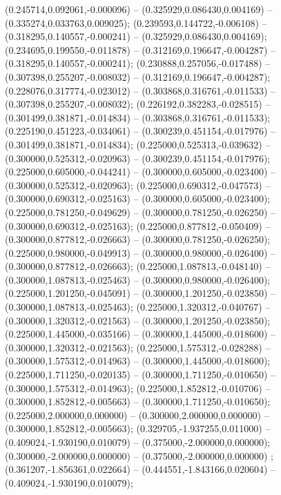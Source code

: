  (0.245714,0.092061,-0.000096) -- (0.325929,0.086430,0.004169) -- (0.335274,0.033763,0.009025);
 (0.239593,0.144722,-0.006108) -- (0.318295,0.140557,-0.000241) -- (0.325929,0.086430,0.004169);
 (0.234695,0.199550,-0.011878) -- (0.312169,0.196647,-0.004287) -- (0.318295,0.140557,-0.000241);
 (0.230888,0.257056,-0.017488) -- (0.307398,0.255207,-0.008032) -- (0.312169,0.196647,-0.004287);
 (0.228076,0.317774,-0.023012) -- (0.303868,0.316761,-0.011533) -- (0.307398,0.255207,-0.008032);
 (0.226192,0.382283,-0.028515) -- (0.301499,0.381871,-0.014834) -- (0.303868,0.316761,-0.011533);
 (0.225190,0.451223,-0.034061) -- (0.300239,0.451154,-0.017976) -- (0.301499,0.381871,-0.014834);
 (0.225000,0.525313,-0.039632) -- (0.300000,0.525312,-0.020963) -- (0.300239,0.451154,-0.017976);
 (0.225000,0.605000,-0.044241) -- (0.300000,0.605000,-0.023400) -- (0.300000,0.525312,-0.020963);
 (0.225000,0.690312,-0.047573) -- (0.300000,0.690312,-0.025163) -- (0.300000,0.605000,-0.023400);
 (0.225000,0.781250,-0.049629) -- (0.300000,0.781250,-0.026250) -- (0.300000,0.690312,-0.025163);
 (0.225000,0.877812,-0.050409) -- (0.300000,0.877812,-0.026663) -- (0.300000,0.781250,-0.026250);
 (0.225000,0.980000,-0.049913) -- (0.300000,0.980000,-0.026400) -- (0.300000,0.877812,-0.026663);
 (0.225000,1.087813,-0.048140) -- (0.300000,1.087813,-0.025463) -- (0.300000,0.980000,-0.026400);
 (0.225000,1.201250,-0.045091) -- (0.300000,1.201250,-0.023850) -- (0.300000,1.087813,-0.025463);
 (0.225000,1.320312,-0.040767) -- (0.300000,1.320312,-0.021563) -- (0.300000,1.201250,-0.023850);
 (0.225000,1.445000,-0.035166) -- (0.300000,1.445000,-0.018600) -- (0.300000,1.320312,-0.021563);
 (0.225000,1.575312,-0.028288) -- (0.300000,1.575312,-0.014963) -- (0.300000,1.445000,-0.018600);
 (0.225000,1.711250,-0.020135) -- (0.300000,1.711250,-0.010650) -- (0.300000,1.575312,-0.014963);
 (0.225000,1.852812,-0.010706) -- (0.300000,1.852812,-0.005663) -- (0.300000,1.711250,-0.010650);
 (0.225000,2.000000,0.000000) -- (0.300000,2.000000,0.000000) -- (0.300000,1.852812,-0.005663);
 (0.329705,-1.937255,0.011000) -- (0.409024,-1.930190,0.010079) -- (0.375000,-2.000000,0.000000);
 (0.300000,-2.000000,0.000000) -- (0.375000,-2.000000,0.000000) ;
 (0.361207,-1.856361,0.022664) -- (0.444551,-1.843166,0.020604) -- (0.409024,-1.930190,0.010079);
